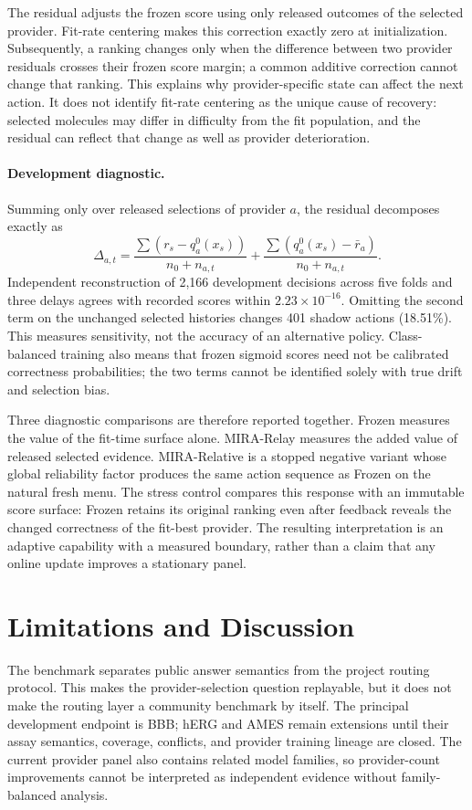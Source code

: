 \documentclass[sigconf,anonymous]{aamas}
\begin{document}
The residual adjusts the frozen score using only released outcomes of the selected provider. Fit-rate centering makes this correction exactly zero at initialization. Subsequently, a ranking changes only when the difference between two provider residuals crosses their frozen score margin; a common additive correction cannot change that ranking. This explains why provider-specific state can affect the next action. It does not identify fit-rate centering as the unique cause of recovery: selected molecules may differ in difficulty from the fit population, and the residual can reflect that change as well as provider deterioration.

\paragraph{Development diagnostic.}
Summing only over released selections of provider $a$, the residual decomposes exactly as
\begin{equation}
\Delta_{a,t}=\frac{\sum(r_s-q_a^0(x_s))}{n_0+n_{a,t}}
            +\frac{\sum(q_a^0(x_s)-\bar r_a)}{n_0+n_{a,t}}.
\end{equation}
Independent reconstruction of 2,166 development decisions across five folds and three delays agrees with recorded scores within $2.23\times10^{-16}$. Omitting the second term on the unchanged selected histories changes 401 shadow actions (18.51\%). This measures sensitivity, not the accuracy of an alternative policy. Class-balanced training also means that frozen sigmoid scores need not be calibrated correctness probabilities; the two terms cannot be identified solely with true drift and selection bias.

Three diagnostic comparisons are therefore reported together. Frozen measures the value of the fit-time surface alone. MIRA-Relay measures the added value of released selected evidence. MIRA-Relative is a stopped negative variant whose global reliability factor produces the same action sequence as Frozen on the natural fresh menu. The stress control compares this response with an immutable score surface: Frozen retains its original ranking even after feedback reveals the changed correctness of the fit-best provider. The resulting interpretation is an adaptive capability with a measured boundary, rather than a claim that any online update improves a stationary panel.

\section{Limitations and Discussion}
The benchmark separates public answer semantics from the project routing protocol. This makes the provider-selection question replayable, but it does not make the routing layer a community benchmark by itself. The principal development endpoint is BBB; hERG and AMES remain extensions until their assay semantics, coverage, conflicts, and provider training lineage are closed. The current provider panel also contains related model families, so provider-count improvements cannot be interpreted as independent evidence without family-balanced analysis.
\end{document}

